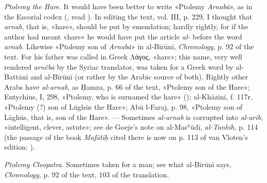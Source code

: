 \documentclass[11pt]{article}
\begin{document}
\par \emph{Ptolemy the Hare}. It would have been better to write «Ptolemy \emph{Arnabā}», as in the Escorial codex (, read ). In editing the text, vol. III, p. 229, I thought that  \emph{arnab}, that is, «hare», should be put by emendation; hardly rightly, for if the author had meant «hare» he would have put the article \emph{al-} before the word \emph{arnab}. Likewise «Ptolemy son of \emph{Arnabā}» in al-Bīrūnī, \emph{Chronology}, p. 92 of the text. For his father was called in Greek {\greekfont Λάγος}, «hare»; this name, very well rendered \emph{arnĕbā} by the Syriac translator, was taken for a Greek word by al-Battānī and al-Bīrūnī (or rather by the Arabic source of both). Rightly other Arabs have \emph{al-arnab}, as Ḥamza, p. 66 of the text, «Ptolemy son of the Hare»; Eutychius, I, 298, «Ptolemy, who is surnamed the hare» (); al-Khāzinī, f. 117r, «Ptolemy  (?) son of Lūghūs the Hare»; Abū l-Faraj, p. 98, «Ptolemy son of Lāghūs, that is, son of the Hare». — Sometimes  \emph{al-arnab} is corrupted into  \emph{al-arīb}, «intelligent, clever, astute»; see de Goeje's note on al-Masʿūdī, \emph{al-Tanbīh}, p. 114 (the passage of the book \emph{Mafātīḥ} cited there is now on p. 113 of van Vloten's edition: ).\par
\par \emph{Ptolemy Cleopatra}. Sometimes taken for a man; see what al-Bīrūnī says, \emph{Chronology}, p. 92 of the text, 103 of the translation.\par
\end{document}
